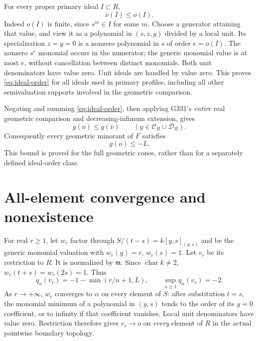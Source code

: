 \documentclass[11pt]{article}
\newcommand{\m}{\mathfrak m}
\newcommand{\Cc}{\mathcal C}
\newcommand{\Dd}{\mathcal D}
\begin{document}
For every proper primary ideal $I\subset R$,
\begin{equation}\label{eq:ideal-order}
 \bar\nu(I)\le o(I).
\end{equation}
Indeed $o(I)$ is finite, since $s^m\in I$ for some $m$.
Choose a generator attaining that value, and view it as a polynomial
in $(s,z,y)$ divided by a local unit. Its specialization $z=y=0$
is a nonzero polynomial in $s$ of order $e=o(I)$.
The nonzero $s^e$ monomial occurs in the numerator; the generic
monomial value is at most $e$, without cancellation between distinct
monomials. Both unit denominators have value zero. Unit ideals are
handled by value zero. This proves \eqref{eq:ideal-order} for all
ideals used in primary profiles, including all other semivaluation
supports involved in the geometric comparison.

Negating and summing \eqref{eq:ideal-order}, then applying G331's
\emph{entire} real geometric comparison and decreasing-infimum
extension, gives
\begin{equation}\label{eq:geometric-order}
 g(o)\le g(\bar\nu)\qquad(g\in\Cc_R\cup\Dd_R).
\end{equation}
Consequently every geometric minorant of $F$ satisfies
\begin{equation}\label{eq:upper}
 g(o)\le-L.
\end{equation}
This bound is proved for the full geometric cones, rather than for
a separately defined ideal-order class.

\section{All-element convergence and nonexistence}
For real $r\ge1$, let $w_r$ factor through
$S/(t-s)=k[y,s]_{(y,s)}$ and be the generic monomial valuation with
$w_r(y)=r$, $w_r(s)=1$. Let $v_r$ be its restriction to $R$.
It is normalized by $\m$. Since $\operatorname{char}k\ne2$,
$w_r(t+s)=w_r(2s)=1$. Thus
\[
 q_n(v_r)=-1-\min(r/n+1,L),\qquad
 \sup_{n\ge1}q_n(v_r)=-2.
\]
As $r\to+\infty$, $w_r$ converges to $\alpha$ on every element of
$S$: after substitution $t=s$, the monomial minimum of a polynomial
in $(y,s)$ tends to the order of its $y=0$ coefficient, or to infinity
if that coefficient vanishes. Local unit denominators have value
zero. Restriction therefore gives $v_r\to o$ on \emph{every}
element of $R$ in the actual pointwise boundary topology.
\end{document}
